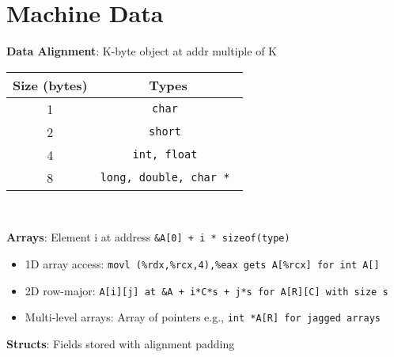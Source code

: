 \vspace{-20pt}
\begin{center}
\begin{figure}[h]
    \centering
    
\end{figure}
\end{center}
\vspace{-50pt}
\section{Machine Data}

\textbf{Data Alignment}: K-byte object at addr multiple of K
\begin{center}
    \begin{tabular}{| c || c |}
    \hline
    \textbf{Size (bytes)} & \textbf{Types}\\ \hline
    1 & \tt{char}  \\ \hline
    2 & \tt{short} \\ \hline
    4 & \tt{int, float}  \\ \hline
    8 & \tt{long, double, char *} \\ \hline
    \end{tabular} \\
\end{center}
\vspace{7pt}
\textbf{Arrays}: Element i at address \tt{\&A[0] + i * sizeof(type)}
\begin{itemize}[noitemsep, topsep=1pt]
    \item 1D array access: \tt{movl (\%rdx,\%rcx,4),\%eax} gets \tt{A[\%rcx]} for \tt{int A[]}
    \item 2D row-major: \tt{A[i][j]} at \tt{\&A + i*C*s + j*s} for \tt{A[R][C]} with size s
    \item Multi-level arrays: Array of pointers e.g., \tt{int *A[R]} for jagged arrays
\end{itemize}
\vspace{10pt}
\textbf{Structs}: Fields stored with alignment padding
